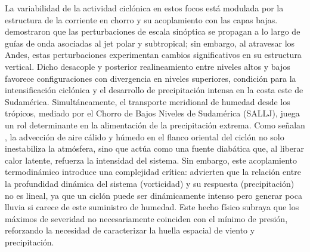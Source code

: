 La variabilidad de la actividad ciclónica en estos focos está modulada por la estructura de la corriente en chorro y su acoplamiento con las capas bajas. \citet{vera2002cold} demostraron que las perturbaciones de escala sinóptica se propagan a lo largo de guías de onda asociadas al jet polar y subtropical; sin embargo, al atravesar los Andes, estas perturbaciones experimentan cambios significativos en su estructura vertical. Dicho desacople y posterior realineamiento entre niveles altos y bajos favorece configuraciones con divergencia en niveles superiores, condición para la intensificación ciclónica y el desarrollo de precipitación intensa en la costa este de Sudamérica.
Simultáneamente, el transporte meridional de humedad desde los trópicos, mediado por el Chorro de Bajos Niveles de Sudamérica (SALLJ), juega un rol determinante en la alimentación de la precipitación extrema. Como señalan \citet{reboita2022from}, la advección de aire cálido y húmedo en el flanco oriental del ciclón no solo inestabiliza la atmósfera, sino que actúa como una fuente diabática que, al liberar calor latente, refuerza la intensidad del sistema.
Sin embargo, este acoplamiento termodinámico introduce una complejidad crítica: \citet{sinclair2023relationship} advierten que la relación entre la profundidad dinámica del sistema (vorticidad) y su respuesta (precipitación) no es lineal, ya que un ciclón puede ser dinámicamente intenso pero generar poca lluvia si carece de este suministro de humedad. Este hecho físico subraya que los máximos de severidad no necesariamente coinciden con el mínimo de presión, reforzando la necesidad de caracterizar la huella espacial de viento y precipitación.

